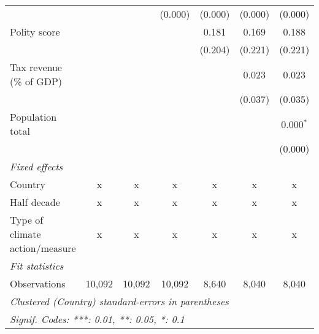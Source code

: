 \begin{tabular}{lcccccc}
                                                                                     &               &               & (0.000)       & (0.000) & (0.000)      & (0.000)\\   
   Polity score                                                                      &               &               &               & 0.181   & 0.169        & 0.188\\   
                                                                                     &               &               &               & (0.204) & (0.221)      & (0.221)\\   
   Tax revenue (\% of GDP)                                                           &               &               &               &         & 0.023        & 0.023\\   
                                                                                     &               &               &               &         & (0.037)      & (0.035)\\   
   Population total                                                                  &               &               &               &         &              & 0.000$^{*}$\\   
                                                                                     &               &               &               &         &              & (0.000)\\   
   \emph{Fixed effects}\\
   Country                                                                           & x             & x             & x             & x       & x            & x\\  
   Half decade                                                                       & x             & x             & x             & x       & x            & x\\  
   Type of climate action/measure                                                    & x             & x             & x             & x       & x            & x\\  
   \midrule \emph{Fit statistics}\\
   Observations                                                                      & 10,092        & 10,092        & 10,092        & 8,640   & 8,040        & 8,040\\  
   \midrule
   \multicolumn{7}{l}{\emph{Clustered (Country) standard-errors in parentheses}}\\
   \multicolumn{7}{l}{\emph{Signif. Codes: ***: 0.01, **: 0.05, *: 0.1}}\\
\end{tabular}
\par\endgroup


